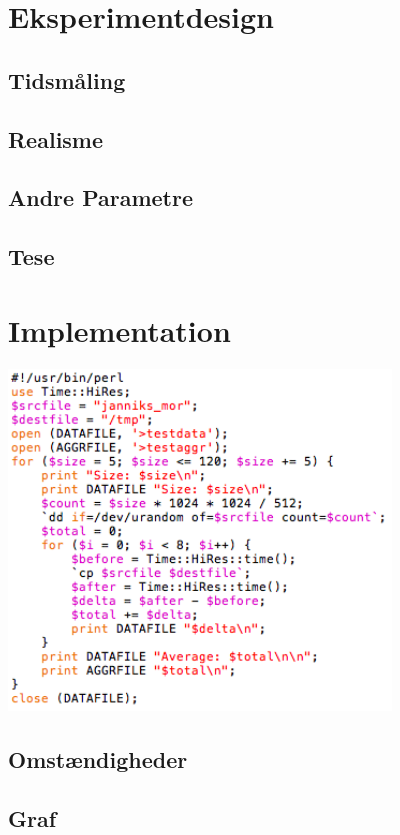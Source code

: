 \documentclass{article}
\author{Mikkel, Jannik, Rune \& Rasmus}
\date{\today}
\begin{document}
\section{Eksperimentdesign}

\subsection{Tidsmåling}

\subsection{Realisme}


\subsection{Andre Parametre}

\subsection{Tese}

\section{Implementation}

\includegraphics[width=4in]{kode.png}

\subsection{Omstændigheder}

\subsection{Graf}
\end{document}
